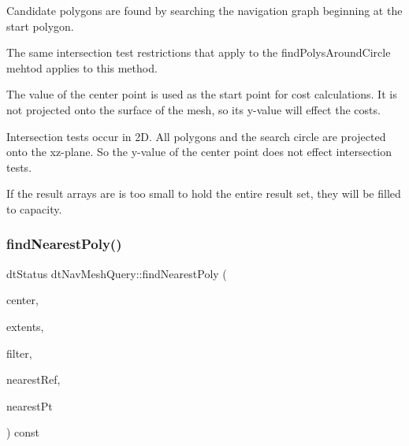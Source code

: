 Candidate polygons are found by searching the navigation graph beginning at the start polygon.

The same intersection test restrictions that apply to the find\+Polys\+Around\+Circle mehtod applies to this method.

The value of the center point is used as the start point for cost calculations. It is not projected onto the surface of the mesh, so its y-\/value will effect the costs.

Intersection tests occur in 2D. All polygons and the search circle are projected onto the xz-\/plane. So the y-\/value of the center point does not effect intersection tests.

If the result arrays are is too small to hold the entire result set, they will be filled to capacity. \mbox{\label{classdtNavMeshQuery_aed1dfebde233657db668416ceaee8537}} 
\subsubsection{\texorpdfstring{find\+Nearest\+Poly()}{findNearestPoly()}\hspace{0.1cm}{\footnotesize\ttfamily [1/2]}}
{\footnotesize\ttfamily dt\+Status dt\+Nav\+Mesh\+Query\+::find\+Nearest\+Poly (\begin{DoxyParamCaption}\item[{const float $\ast$}]{center,  }\item[{const float $\ast$}]{extents,  }\item[{const \hyperlink{classdtQueryFilter}{dt\+Query\+Filter} $\ast$}]{filter,  }\item[{\hyperlink{group__detour_gab4e0b2257a670c1a800057999612b466}{dt\+Poly\+Ref} $\ast$}]{nearest\+Ref,  }\item[{float $\ast$}]{nearest\+Pt }\end{DoxyParamCaption}) const}

